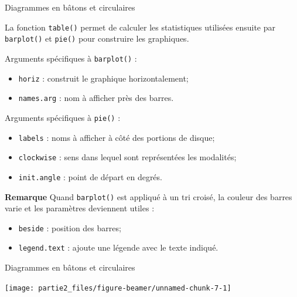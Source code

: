 \documentclass[12pt,ignorenonframetext,]{beamer}
\newenvironment{Shaded}{}{}
\newcommand{\DataTypeTok}[1]{#1}
\newcommand{\KeywordTok}[1]{\textcolor[rgb]{0.00,0.00,1.00}{#1}}
\newcommand{\NormalTok}[1]{#1}
\newcommand{\OperatorTok}[1]{#1}
\newcommand{\StringTok}[1]{\textcolor[rgb]{0.00,0.50,0.50}{#1}}
\providecommand{\tightlist}{%
  \setlength{\itemsep}{0pt}\setlength{\parskip}{0pt}}
\renewenvironment{Shaded}{\begin{snugshade}}{\end{snugshade}}
\newcommand{\intertitre}[1]{\textcolor{redInsee}{\textbf{#1}}}
\begin{document}
\begin{frame}[fragile]{Diagrammes en bâtons et circulaires}
\protect\hypertarget{diagrammes-en-batons-et-circulaires}{}

La fonction \texttt{table()} permet de calculer les statistiques
utilisées ensuite par \texttt{barplot()} et \texttt{pie()} pour
construire les graphiques.

\pause Arguments spécifiques à \texttt{barplot()} : \vspace{-3mm}

\begin{itemize}
\tightlist
\item
  \texttt{horiz} : construit le graphique horizontalement;
\item
  \texttt{names.arg} : nom à afficher près des barres.
\end{itemize}

\pause Arguments spécifiques à \texttt{pie()} : \vspace{-3mm}

\begin{itemize}
\tightlist
\item
  \texttt{labels} : noms à afficher à côté des portions de disque;
\item
  \texttt{clockwise} : sens dans lequel sont représentées les modalités;
\item
  \texttt{init.angle} : point de départ en degrés.
\end{itemize}

\pause

\intertitre{Remarque} Quand \texttt{barplot()} est appliqué à un tri
croisé, la couleur des barres varie et les paramètres deviennent utiles
: \vspace{-3mm}

\begin{itemize}
\tightlist
\item
  \texttt{beside} : position des barres;
\item
  \texttt{legend.text} : ajoute une légende avec le texte indiqué.
\end{itemize}

\end{frame}

\begin{frame}[fragile]{Diagrammes en bâtons et circulaires}
\protect\hypertarget{diagrammes-en-batons-et-circulaires-1}{}

\centering \footnotesize

\begin{Shaded}
\end{Shaded}

\texttt{[image: partie2\_files/figure-beamer/unnamed-chunk-7-1]}

\end{frame}
\end{document}
